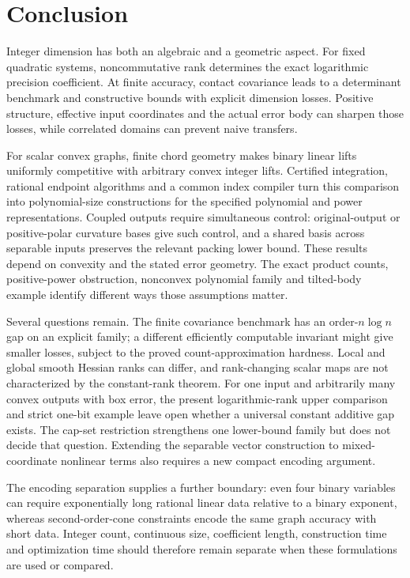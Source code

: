 \section{Conclusion}\label{sec:conclusion}

Integer dimension has both an algebraic and a geometric aspect. For fixed
quadratic systems, noncommutative rank determines the exact logarithmic
precision coefficient. At finite accuracy, contact covariance leads to a
determinant benchmark and constructive bounds with explicit dimension
losses. Positive structure, effective input coordinates and the actual
error body can sharpen those losses, while correlated domains can prevent
naive transfers.

For scalar convex graphs, finite chord geometry makes binary linear lifts
uniformly competitive with arbitrary convex integer lifts. Certified
integration, rational endpoint algorithms and a common index compiler
turn this comparison into polynomial-size constructions for the specified
polynomial and power representations. Coupled outputs require simultaneous
control: original-output or positive-polar curvature bases give such control,
and a shared basis across separable inputs preserves the relevant packing
lower bound. These results depend on convexity and the stated error geometry.
The exact product counts, positive-power obstruction, nonconvex polynomial
family and tilted-body example identify different ways those assumptions
matter.

Several questions remain. The finite covariance benchmark has an
order-$n\log n$ gap on an explicit family; a different efficiently
computable invariant might give smaller losses, subject to the proved
count-approximation hardness. Local and global smooth Hessian ranks can
differ, and rank-changing scalar maps are not characterized by the
constant-rank theorem. For one input and arbitrarily many convex outputs
with box error, the present logarithmic-rank upper comparison and strict
one-bit example leave open whether a universal constant additive gap
exists. The cap-set restriction strengthens one lower-bound family but
does not decide that question. Extending the separable vector construction
to mixed-coordinate nonlinear terms also requires a new compact encoding
argument.

The encoding separation supplies a further boundary: even four binary
variables can require exponentially long rational linear data relative
to a binary exponent, whereas second-order-cone constraints encode the
same graph accuracy with short data. Integer count, continuous size,
coefficient length, construction time and optimization time should
therefore remain separate when these formulations are used or compared.
